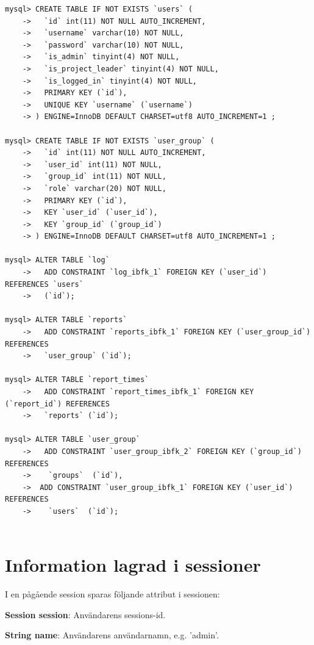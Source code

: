 \documentclass[a4paper]{article}
\begin{document}
\begin{lstlisting}
mysql> CREATE TABLE IF NOT EXISTS `users` (
    ->   `id` int(11) NOT NULL AUTO_INCREMENT,
    ->   `username` varchar(10) NOT NULL,
    ->   `password` varchar(10) NOT NULL,
    ->   `is_admin` tinyint(4) NOT NULL,
    ->   `is_project_leader` tinyint(4) NOT NULL,
    ->   `is_logged_in` tinyint(4) NOT NULL,
    ->   PRIMARY KEY (`id`),
    ->   UNIQUE KEY `username` (`username`)
    -> ) ENGINE=InnoDB DEFAULT CHARSET=utf8 AUTO_INCREMENT=1 ;
    
mysql> CREATE TABLE IF NOT EXISTS `user_group` (
    ->   `id` int(11) NOT NULL AUTO_INCREMENT,
    ->   `user_id` int(11) NOT NULL,
    ->   `group_id` int(11) NOT NULL,
    ->   `role` varchar(20) NOT NULL,
    ->   PRIMARY KEY (`id`),
    ->   KEY `user_id` (`user_id`),
    ->   KEY `group_id` (`group_id`)
    -> ) ENGINE=InnoDB DEFAULT CHARSET=utf8 AUTO_INCREMENT=1 ;
    
mysql> ALTER TABLE `log`
    ->   ADD CONSTRAINT `log_ibfk_1` FOREIGN KEY (`user_id`) REFERENCES `users`
    ->   (`id`);

mysql> ALTER TABLE `reports`
    ->   ADD CONSTRAINT `reports_ibfk_1` FOREIGN KEY (`user_group_id`) REFERENCES
    ->   `user_group` (`id`);

mysql> ALTER TABLE `report_times`
    ->   ADD CONSTRAINT `report_times_ibfk_1` FOREIGN KEY (`report_id`) REFERENCES
    ->   `reports` (`id`);

mysql> ALTER TABLE `user_group`
    ->   ADD CONSTRAINT `user_group_ibfk_2` FOREIGN KEY (`group_id`) REFERENCES
    ->    `groups`  (`id`),
    ->  ADD CONSTRAINT `user_group_ibfk_1` FOREIGN KEY (`user_id`) REFERENCES
    ->    `users`  (`id`);
  
\end{lstlisting}


\section{Information lagrad i sessioner}
I en pågående session sparas följande attribut i sessionen:

\vspace{5mm}
\begin{hangparas}{1.5em}{1}
\textbf{Session session}: Användarens sessions-id.
\end{hangparas}

\vspace{5mm}
\begin{hangparas}{1.5em}{1}
\textbf{String name}: Användarens användarnamn, e.g. 'admin'. 
\end{hangparas}
\end{document}
